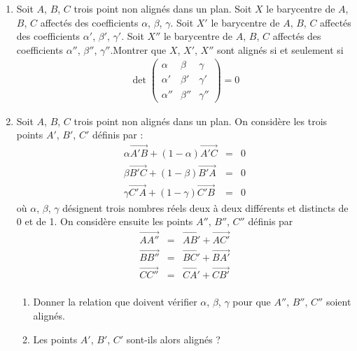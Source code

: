 \begin{enumerate}
  \item Soit $A$, $B$, $C$ trois point non align{\'e}s dans un plan. Soit $X$
le barycentre de $A$, $B$, $C$ affect{\'e}s des coefficients $\alpha$,
$\beta$, $\gamma$. Soit $X'$ le barycentre de $A$, $B$, $C$
affect{\'e}s des coefficients $\alpha'$, $\beta'$, $\gamma'$. Soit
$X''$ le barycentre de $A$, $B$, $C$ affect{\'e}s des coefficients
$\alpha''$, $\beta''$, $\gamma''$.\newline Montrer que $X$, $X'$,
$X''$ sont align{\'e}s si et seulement si
\begin{eqnarray*}
\det \begin{pmatrix}
  \alpha & \beta & \gamma \\
  \alpha' & \beta' & \gamma' \\
  \alpha'' & \beta'' & \gamma''
\end{pmatrix}=0
\end{eqnarray*}

  \item Soit $A$, $B$, $C$ trois point non align{\'e}s dans un plan.
  On consid{\`e}re les trois points $A'$, $B'$, $C'$ d{\'e}finis par :
  \begin{eqnarray*}
  \alpha \overrightarrow{A'B}
  +(1-\alpha)\overrightarrow{A'C}&=&0\\
  \beta\overrightarrow{B'C}+(1-\beta)\overrightarrow{B'A}&=&0\\
  \gamma\overrightarrow{C'A}+(1-\gamma)\overrightarrow{C'B}&=&0
  \end{eqnarray*}
  o{\`u} $\alpha$, $\beta$, $\gamma$ d{\'e}signent trois nombres r{\'e}els
  deux {\`a} deux diff{\'e}rents et distincts de 0 et de 1. On consid{\`e}re
  ensuite les points $A''$, $B''$, $C''$ d{\'e}finis par
  \begin{eqnarray*}
  \overrightarrow{AA''}&=&\overrightarrow{A B'}+\overrightarrow{AC'}\\
  \overrightarrow{B B''}&=&\overrightarrow{BC'}+\overrightarrow{BA'}\\
  \overrightarrow{C C''}&=&\overrightarrow{CA'}+\overrightarrow{CB'}\\
  \end{eqnarray*}
\begin{enumerate}
  \item Donner la relation que doivent v{\'e}rifier $\alpha$, $\beta$,
  $\gamma$ pour que $A''$, $B''$, $C''$ soient align{\'e}s.
  \item Les points $A'$, $B'$, $C'$ sont-ils alors align{\'e}s ?
\end{enumerate}

\end{enumerate}
